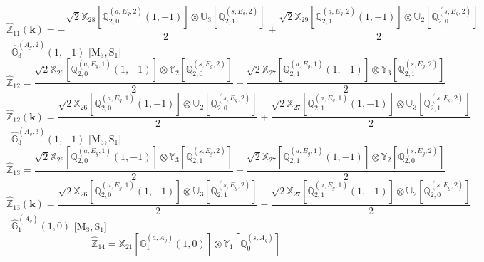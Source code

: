 \documentclass[fleqn,10pt,landscape]{article}
\begin{document}
\begin{itemize}
\begin{dmath*}
\end{dmath*}
\begin{dmath*}
\hat{\mathbb{Z}}_{11}(\bm{k})=- \frac{\sqrt{2} \mathbb{X}_{28}[\mathbb{Q}_{2,0}^{(a,E_{g},2)}(1,-1)] \otimes\mathbb{U}_{3}[\mathbb{Q}_{2,1}^{(s,E_{g},2)}]}{2} + \frac{\sqrt{2} \mathbb{X}_{29}[\mathbb{Q}_{2,1}^{(a,E_{g},2)}(1,-1)] \otimes\mathbb{U}_{2}[\mathbb{Q}_{2,0}^{(s,E_{g},2)}]}{2}
\end{dmath*}
\vspace{4mm}
\noindent {} $\,\,\,\hat{\mathbb{G}}_{3}^{(A_{g},2)}(1,-1)$ [M$_{3}$,\,S$_{1}$]
\begin{dmath*}
\hat{\mathbb{Z}}_{12}=\frac{\sqrt{2} \mathbb{X}_{26}[\mathbb{Q}_{2,0}^{(a,E_{g},1)}(1,-1)] \otimes\mathbb{Y}_{2}[\mathbb{Q}_{2,0}^{(s,E_{g},2)}]}{2} + \frac{\sqrt{2} \mathbb{X}_{27}[\mathbb{Q}_{2,1}^{(a,E_{g},1)}(1,-1)] \otimes\mathbb{Y}_{3}[\mathbb{Q}_{2,1}^{(s,E_{g},2)}]}{2}
\end{dmath*}
\begin{dmath*}
\hat{\mathbb{Z}}_{12}(\bm{k})=\frac{\sqrt{2} \mathbb{X}_{26}[\mathbb{Q}_{2,0}^{(a,E_{g},1)}(1,-1)] \otimes\mathbb{U}_{2}[\mathbb{Q}_{2,0}^{(s,E_{g},2)}]}{2} + \frac{\sqrt{2} \mathbb{X}_{27}[\mathbb{Q}_{2,1}^{(a,E_{g},1)}(1,-1)] \otimes\mathbb{U}_{3}[\mathbb{Q}_{2,1}^{(s,E_{g},2)}]}{2}
\end{dmath*}
\vspace{4mm}
\noindent {} $\,\,\,\hat{\mathbb{G}}_{3}^{(A_{g},3)}(1,-1)$ [M$_{3}$,\,S$_{1}$]
\begin{dmath*}
\hat{\mathbb{Z}}_{13}=\frac{\sqrt{2} \mathbb{X}_{26}[\mathbb{Q}_{2,0}^{(a,E_{g},1)}(1,-1)] \otimes\mathbb{Y}_{3}[\mathbb{Q}_{2,1}^{(s,E_{g},2)}]}{2} - \frac{\sqrt{2} \mathbb{X}_{27}[\mathbb{Q}_{2,1}^{(a,E_{g},1)}(1,-1)] \otimes\mathbb{Y}_{2}[\mathbb{Q}_{2,0}^{(s,E_{g},2)}]}{2}
\end{dmath*}
\begin{dmath*}
\hat{\mathbb{Z}}_{13}(\bm{k})=\frac{\sqrt{2} \mathbb{X}_{26}[\mathbb{Q}_{2,0}^{(a,E_{g},1)}(1,-1)] \otimes\mathbb{U}_{3}[\mathbb{Q}_{2,1}^{(s,E_{g},2)}]}{2} - \frac{\sqrt{2} \mathbb{X}_{27}[\mathbb{Q}_{2,1}^{(a,E_{g},1)}(1,-1)] \otimes\mathbb{U}_{2}[\mathbb{Q}_{2,0}^{(s,E_{g},2)}]}{2}
\end{dmath*}
\vspace{4mm}
\noindent {} $\,\,\,\hat{\mathbb{G}}_{1}^{(A_{g})}(1,0)$ [M$_{3}$,\,S$_{1}$]
\begin{dmath*}
\hat{\mathbb{Z}}_{14}=\mathbb{X}_{21}[\mathbb{G}_{1}^{(a,A_{g})}(1,0)] \otimes\mathbb{Y}_{1}[\mathbb{Q}_{0}^{(s,A_{g})}]

\end{dmath*}
\end{itemize}
\end{document}

